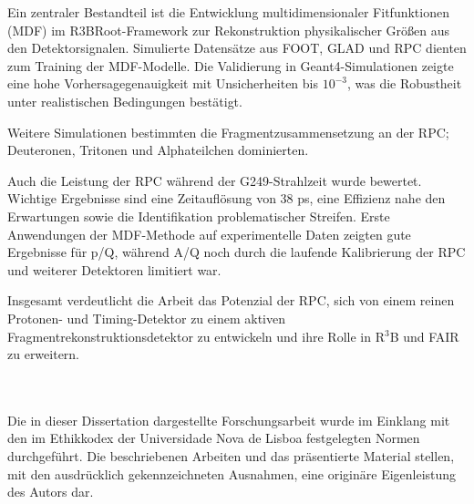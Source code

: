 Ein zentraler Bestandteil ist die Entwicklung multidimensionaler Fitfunktionen (MDF) im R3BRoot-Framework zur Rekonstruktion physikalischer Größen aus den Detektorsignalen. Simulierte Datensätze aus FOOT, GLAD und RPC dienten zum Training der MDF-Modelle. Die Validierung in Geant4-Simulationen zeigte eine hohe Vorhersagegenauigkeit mit Unsicherheiten bis $10^{-3}$, was die Robustheit unter realistischen Bedingungen bestätigt.

Weitere Simulationen bestimmten die Fragmentzusammensetzung an der RPC; Deuteronen, Tritonen und Alphateilchen dominierten.

Auch die Leistung der RPC während der G249-Strahlzeit wurde bewertet. Wichtige Ergebnisse sind eine Zeitauflösung von 38 ps, eine Effizienz nahe den Erwartungen sowie die Identifikation problematischer Streifen. Erste Anwendungen der MDF-Methode auf experimentelle Daten zeigten gute Ergebnisse für p/Q, während A/Q noch durch die laufende Kalibrierung der RPC und weiterer Detektoren limitiert war.

Insgesamt verdeutlicht die Arbeit das Potenzial der RPC, sich von einem reinen Protonen- und Timing-Detektor zu einem aktiven Fragmentrekonstruktionsdetektor zu entwickeln und ihre Rolle in R$^3$B und FAIR zu erweitern.


\\
\\
Die in dieser Dissertation dargestellte Forschungsarbeit wurde im Einklang mit den im Ethikkodex der Universidade Nova de Lisboa festgelegten Normen durchgeführt. Die beschriebenen Arbeiten und das präsentierte Material stellen, mit den ausdrücklich gekennzeichneten Ausnahmen, eine originäre Eigenleistung des Autors dar.

